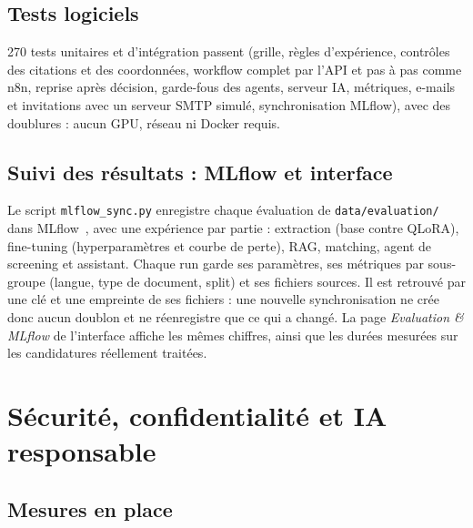 \documentclass[11pt,a4paper]{report}
\begin{document}
\section{Tests logiciels}

270 tests unitaires et d'intégration passent (grille, règles d'expérience, contrôles des citations et des coordonnées, workflow complet par l'API et pas à pas comme n8n, reprise après décision, garde-fous des agents, serveur IA, métriques, e-mails et invitations avec un serveur SMTP simulé, synchronisation MLflow), avec des doublures : aucun GPU, réseau ni Docker requis.

\section{Suivi des résultats : MLflow et interface}
\label{sec:mlflow}

Le script \texttt{mlflow\_sync.py} enregistre chaque évaluation de \texttt{data/evaluation/} dans MLflow~\cite{mlflow}, avec une expérience par partie : extraction (base contre QLoRA), fine-tuning (hyperparamètres et courbe de perte), RAG, matching, agent de screening et assistant. Chaque run garde ses paramètres, ses métriques par sous-groupe (langue, type de document, split) et ses fichiers sources. Il est retrouvé par une clé et une empreinte de ses fichiers : une nouvelle synchronisation ne crée donc aucun doublon et ne réenregistre que ce qui a changé. La page \emph{Evaluation \& MLflow} de l'interface affiche les mêmes chiffres, ainsi que les durées mesurées sur les candidatures réellement traitées.

\chapter{Sécurité, confidentialité et IA responsable}
\label{ch:securite}

\section{Mesures en place}
\end{document}
